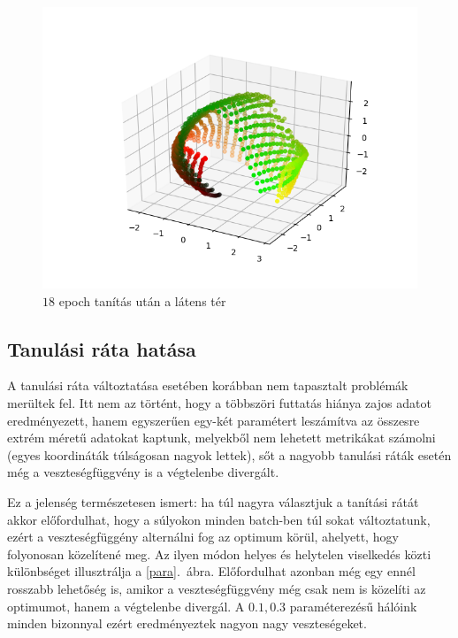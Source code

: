 \begin{figure}[h!]
\begin{center}
 
	\begin{center}
	\includegraphics[width=1\linewidth]{metrics/3D-epoch18.png}
	\end{center}
	
  \caption{$18$ epoch tanítás után a látens tér}\label{3D-epoch}
\end{center}
\end{figure}

\subsection{Tanulási ráta hatása}

A tanulási ráta változtatása esetében korábban nem tapasztalt problémák merültek fel. Itt nem az történt, hogy a többszöri futtatás hiánya zajos adatot eredményezett, hanem egyszerűen egy-két paramétert leszámítva az összesre extrém méretű adatokat kaptunk, melyekből nem lehetett metrikákat számolni (egyes koordináták túlságosan nagyok lettek), sőt a nagyobb tanulási ráták esetén még a veszteségfüggvény is a végtelenbe divergált.

Ez a jelenség természetesen ismert: ha túl nagyra választjuk a tanítási rátát akkor előfordulhat, hogy a súlyokon minden batch-ben túl sokat változtatunk, ezért a veszteségfüggény alternálni fog az optimum körül, ahelyett, hogy folyonosan közelítené meg. Az ilyen módon helyes és helytelen viselkedés közti különbséget illusztrálja a \ref{para}.~ábra. Előfordulhat azonban még egy ennél rosszabb lehetőség is, amikor a veszteségfüggvény még csak nem is közelíti az optimumot, hanem a végtelenbe divergál. A $0.1, 0.3$ paraméterezésű hálóink minden bizonnyal ezért eredményeztek nagyon nagy veszteségeket.

